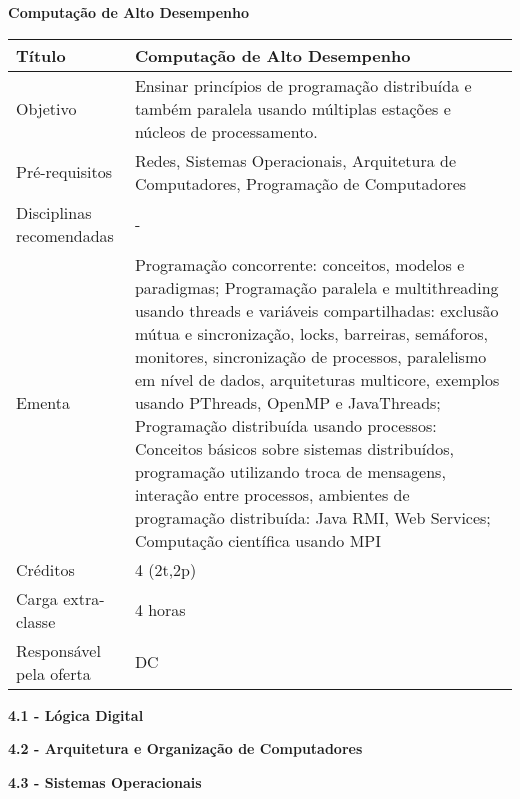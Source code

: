 \textbf{Computação de Alto Desempenho}


\begin{tabular}{|p{4.5cm}|p{10.0cm}|} \hline

Título & Computação de Alto Desempenho \\ \hline
Objetivo & Ensinar princípios de programação distribuída e também paralela usando múltiplas estações e núcleos de processamento. \\ \hline
Pré-requisitos &  Redes,  Sistemas Operacionais, Arquitetura de Computadores, Programação de Computadores \\ \hline
Disciplinas recomendadas & - \\ \hline
Ementa & Programação concorrente: conceitos, modelos e paradigmas; Programação paralela e multithreading usando threads e variáveis compartilhadas: exclusão mútua
e sincronização, locks, barreiras, semáforos, monitores, sincronização de processos, paralelismo em nível de dados, arquiteturas multicore, exemplos usando PThreads, OpenMP e JavaThreads; Programação distribuída usando processos: Conceitos básicos sobre sistemas distribuídos, programação utilizando troca de mensagens, interação entre processos, ambientes de programação distribuída: Java RMI, Web Services; Computação científica  usando MPI \\ \hline
Créditos & 4 (2t,2p) \\ \hline
Carga extra-classe & 4 horas \\ \hline
Responsável pela oferta & DC \\ \hline
\end{tabular}




\textbf{4.1 - Lógica Digital } %

\normalem

\begin{center}
\end{center}

\textbf{4.2 - Arquitetura e Organização de Computadores} %



\textbf{4.3 - Sistemas Operacionais}

